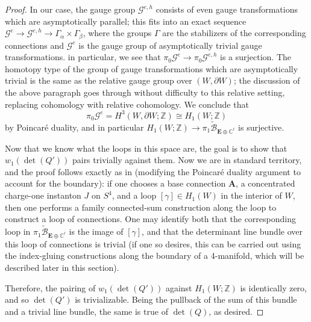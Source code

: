 \documentclass{memo-l}
\theoremstyle{definition}
\theoremstyle{remark}
\numberwithin{section}{chapter}
\numberwithin{equation}{chapter}
\begin{document}
\begin{proof}
In our case, the gauge group $\mathcal G^{e,h}$ consists of even gauge transformations which are asymptotically parallel; this fits into an exact sequence $\mathcal G^e \to \mathcal G^{e,h} \to \Gamma_\alpha \times \Gamma_\beta$, where the groups $\Gamma$ are the stabilizers of the corresponding connections and $\mathcal G^e$ is the gauge group of asymptotically trivial gauge transformations. in particular, we see that $\pi_0 \mathcal G^e \to \pi_0 \mathcal G^{e,h}$ is a surjection. The homotopy type of the group of gauge transformations which are asymptotically trivial is the same as the relative gauge group over $(W, \partial W)$; the discussion of the above paragraph goes through without difficulty to this relative setting, replacing cohomology with relative cohomology. We conclude that 
$$\pi_0 \mathcal G^e = H^3(W, \partial W; \mathbb Z) \cong H_1(W;\mathbb Z)$$ 
by Poincar\'e duality, and in particular $H_1(W;\mathbb Z) \to \pi_1 \widetilde{\mathcal B}_{\mathbf{E} \oplus \mathbb C^\ell}$ is surjective.

Now that we know what the loops in this space are, the goal is to show that $w_1(\det(Q'))$ pairs trivially against them. Now we are in standard territory, and the proof follows exactly as in \cite[Lemma~3.23]{donaldson1987orientation} (modifying the Poincar\'e duality argument to account for the boundary): if one chooses a base connection $\mathbf{A}$, a concentrated charge-one instanton $J$ on $S^4$, and a loop $[\gamma] \in H_1(W)$ in the interior of $W$, then one performs a family connected-sum construction along the loop to construct a loop of connections. One may identify both that the corresponding loop in $\pi_1 \widetilde{\mathcal B}_{\mathbf{E} \oplus \mathbb C^\ell}$ is the image of $[\gamma]$, and that the determinant line bundle over this loop of connections is trivial (if one so desires, this can be carried out using the index-gluing constructions along the boundary of a 4-manifold, which will be described later in this section).

Therefore, the pairing of $w_1(\det(Q'))$ against $H_1(W;\mathbb Z)$ is identically zero, and so $\det(Q')$ is trivializable. Being the pullback of the sum of this bundle and a trivial line bundle, the same is true of $\det(Q)$, as desired.
\end{proof}
\end{document}
